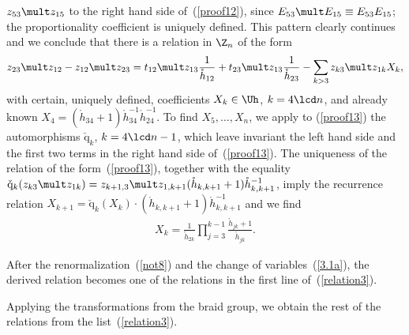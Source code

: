 \documentclass[11pt]{article}
\def\nplus{\mathfrak{n}}\def\nn{\nonumber}\def\nin{\noindent}
\def\q{\check{\mathrm q}}\def\Q{\mathrm{Q}}\def\r#1{(\ref{#1})}\let\rf=\r
\def\s{z}\def\S{\mathrm {S}}\def\si{\sigma}\def\Sp{\S^{\nplus}}\def\sy{\acute{\sigma}}\def\th{\mathring{h}}
\numberwithin{equation}{section}
\begin{document}
$\s_{53}\mult\s_{15}$ to the right hand side of~\rf{proof12}, since $E_{53}\mult E_{15}\equiv E_{53}E_{15}$;
the proportionality coef\/f\/icient is uniquely def\/ined.
This pattern clearly continues and we conclude that there is a relation in $\Z_n$ of the form
\begin{gather}\label{proof13}
\s_{23}\mult\s_{12}-\s_{12}\mult\s_{23}=t_{12}\mult\s_{13} \frac{1}{\th_{12}}+t_{23}\mult\s_{13}\frac{1}{\th_{23}}-
\sum_{k>3}\s_{k3}\mult\s_{1k}X_k  ,
\end{gather}
with certain, uniquely def\/ined, coef\/f\/icients $X_k\in\Uh$, $k=4\lcd n$, and already known $X_4=(\th_{34}+1)
{\th_{34}^{-1}\th_{24}^{-1}}$. To f\/ind $X_5,\dots ,X_n$, we apply to \rf{proof13} the
automorphisms $\q_k$, $k=4\lcd n-1$, which leave invariant the left hand side and the f\/irst two terms in the
right hand side of~\rf{proof13}. The uniqueness of the relation of the form~\rf{proof13}, together with the equality
$\q_k(\s_{k3}\mult\s_{1k})=\s_{k+1,3}\mult\s_{1,k+1}(\th_{k,k+1}+1)\th_{k,k+1}^{-1}$, imply the recurrence relation
$X_{k+1}=\q_k(X_k)\cdot(\th_{k,k+1}+1)\th_{k,k+1}^{-1}$ and we f\/ind
\begin{gather*}%
X_k=\frac{1}{\th_{2k}}\prod_{j=3}^{k-1}\frac{\th_{jk}+1}{\th_{jk}}  .
\end{gather*}

After the renormalization~\rf{not8} and the change of variables~\rf{3.1a}, the derived relation becomes one of the
relations in the f\/irst line of~\rf{relation3}.


Applying the transformations from the braid group, we obtain the rest of the relations from the list~\rf{relation3}.
\end{document}
